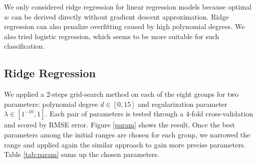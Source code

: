 \documentclass[10pt,conference,compsocconf]{IEEEtran}
\begin{document}



%


We only considered ridge regression for linear regression models because optimal $w$ can be derived directly without gradient descent approximation. Ridge regression can also penalize overfitting caused by high polynomial degrees. We also tried logistic regression, which seems to be more suitable for such classification.

\subsection{Ridge Regression}
We applied a 2-steps grid-search method on each of the eight groups for two parameters: polynomial degree $d \in [0, 15]$ and regularization parameter $\lambda \in [1^{-10}, 1]$.  Each pair of parameters is tested through a 4-fold cross-validation and scored by RMSE error. Figure \ref{param} shows the result. Once the best parameters among the initial ranges are chosen for each group, we narrowed the range and applied again the similar approach to gain more precise parameters. Table \ref{tab:param} sums up the chosen parameters.
\end{document}
